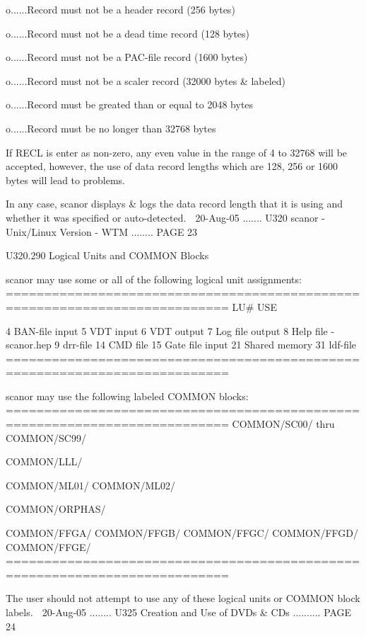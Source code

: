    o......Record must not be a header    record (256   bytes)
 
   o......Record must not be a dead time record (128   bytes)
 
   o......Record must not be a PAC-file  record (1600  bytes)
 
   o......Record must not be a scaler    record (32000 bytes & labeled)
 
   o......Record must be greated than or equal to 2048 bytes
 
   o......Record must be no longer than 32768 bytes
 
   If RECL is enter as non-zero, any even value in the range  of  4  to  32768
   will  be  accepted,  however, the use of data record lengths which are 128,
   256 or 1600 bytes will lead to problems.
 
 
   In any case, scanor displays & logs the data record length that it is using
   and whether it was specified or auto-detected.
    
   20-Aug-05 ....... U320  scanor - Unix/Linux Version - WTM ........ PAGE  23
 
 
 
   U320.290  Logical Units and COMMON Blocks
 
   scanor may use some or all of the following logical unit assignments:
   ===========================================================================
   LU#     USE
 
     4     BAN-file input
     5     VDT input
     6     VDT output
     7     Log file output
     8     Help file - scanor.hep
     9     drr-file
    14     CMD file
    15     Gate file input
    21     Shared memory
    31     ldf-file
   ===========================================================================
 
 
 
 
 
   scanor may use the following labeled COMMON blocks:
   ===========================================================================
   COMMON/SC00/ thru COMMON/SC99/
 
   COMMON/LLL/
 
   COMMON/ML01/
   COMMON/ML02/
 
   COMMON/ORPHAS/
 
   COMMON/FFGA/
   COMMON/FFGB/
   COMMON/FFGC/
   COMMON/FFGD/
   COMMON/FFGE/
   ===========================================================================
 
   The user should not attempt to use any of these  logical  units  or  COMMON
   block labels.
    
   20-Aug-05 ........ U325  Creation and Use of DVDs & CDs .......... PAGE  24
 
